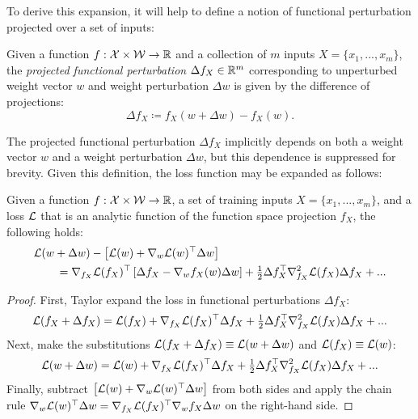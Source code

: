 \begin{refsection}
To derive this expansion, it will help to define a notion of functional perturbation projected over a set of inputs:
\begin{definition} Given a function $f:\mathcal{X}\times \mathcal{W}\to\mathbb{R}$ and a collection of $m$ inputs $X=\{x_1,...,x_m\}$, the \textit{projected functional perturbation} $\Delta f_X\in\mathbb{R}^m$ corresponding to unperturbed weight vector $w$ and weight perturbation $\Delta w$ is given by the difference of projections:
\begin{equation}
    \Delta f_X \coloneqq f_X(w+\Delta w) - f_X(w).
\end{equation}
\end{definition}
The projected functional perturbation $\Delta f_X$ implicitly depends on both a weight vector $w$ and a weight perturbation $\Delta w$, but this dependence is suppressed for brevity. Given this definition, the loss function may be expanded as follows:

\begin{lemma}\label{lem:function-taylor} Given a function $f: \mathcal{X}\times \mathcal{W} \to \mathbb{R}$, a set of training inputs $X = \{x_1,...,x_m\}$, and a loss $\mathcal{L}$ that is an analytic function of the function space projection $f_X$, the following holds:
    \begin{align}
        &\mathcal{L}(w+\Delta w) -\left[ \mathcal{L}(w) + \nabla_w\mathcal{L}(w)^\top \Delta w\right] \nonumber \\
        &\qquad= \nabla_{f_X} \mathcal{L}(f_X)^\top \left[\Delta f_X - \nabla_w f_X(w) \Delta w \right] + \tfrac{1}{2} \Delta f_X^\top \nabla^2_{f_X} \mathcal{L}(f_X) \Delta f_X + ...
    \end{align}
\end{lemma}
\begin{proof} First, Taylor expand the loss in functional perturbations $\Delta f_X$:
    \begin{equation*}
        \mathcal{L}(f_X+\Delta f_X) = \mathcal{L}(f_X) + \nabla_{f_X} \mathcal{L}(f_X)^\top \Delta f_X + \tfrac{1}{2} \Delta f_X^\top \nabla^2_{f_X} \mathcal{L}(f_X) \Delta f_X + ...
    \end{equation*}
Next, make the substitutions $\mathcal{L}(f_X+\Delta f_X) \equiv \mathcal{L}(w+\Delta w)$ and $\mathcal{L}(f_X) \equiv \mathcal{L}(w)$:
\begin{equation*}
        \mathcal{L}(w+\Delta w) = \mathcal{L}(w) + \nabla_{f_X} \mathcal{L}(f_X)^\top \Delta f_X + \tfrac{1}{2} \Delta f_X^\top \nabla^2_{f_X} \mathcal{L}(f_X) \Delta f_X + ...
    \end{equation*}
    Finally, subtract $\left[ \mathcal{L}(w) + \nabla_w\mathcal{L}(w)^\top \Delta w\right]$ from both sides and apply the chain rule $\nabla_w\mathcal{L}(w)^\top \Delta w = \nabla_{f_X}\mathcal{L}(f_X)^\top\nabla_w f_X \Delta w$ on the right-hand side.
\end{proof}


\end{refsection}
